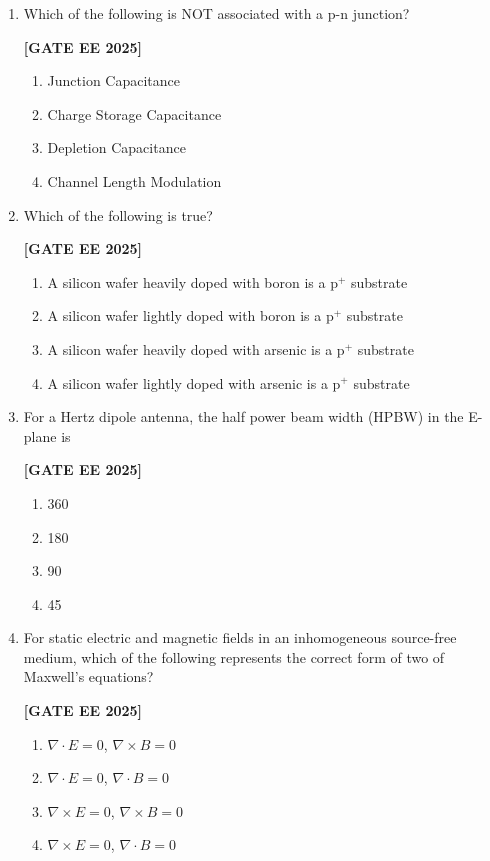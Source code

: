 \documentclass[12pt]{article}
\begin{document}
\begin{enumerate}[leftmargin=2.5em, label=\textbf{Q.\arabic*}., itemsep=2em]
\item
Which of the following is NOT associated with a p-n junction?
 
\noindent \textbf{[GATE EE 2025]}
\begin{enumerate}
  \item Junction Capacitance
  \item Charge Storage Capacitance
  \item Depletion Capacitance
  \item Channel Length Modulation
\end{enumerate}

\item
Which of the following is true?
 
\noindent \textbf{[GATE EE 2025]}
\begin{enumerate}
  \item A silicon wafer heavily doped with boron is a p$^+$ substrate
  \item A silicon wafer lightly doped with boron is a p$^+$ substrate
  \item A silicon wafer heavily doped with arsenic is a p$^+$ substrate
  \item A silicon wafer lightly doped with arsenic is a p$^+$ substrate
\end{enumerate}

\item
For a Hertz dipole antenna, the half power beam width (HPBW) in the E-plane is
 
\noindent \textbf{[GATE EE 2025]}
\begin{enumerate}
  \item 360\degree
  \item 180\degree
  \item 90\degree
  \item 45\degree
\end{enumerate}

\item
For static electric and magnetic fields in an inhomogeneous source-free medium, which of the following represents the correct form of two of Maxwell's equations?
 
\noindent \textbf{[GATE EE 2025]}
\begin{enumerate}
  \item $\nabla \cdot E = 0$, \quad $\nabla \times B = 0$
  \item $\nabla \cdot E = 0$, \quad $\nabla \cdot B = 0$
  \item $\nabla \times E = 0$, \quad $\nabla \times B = 0$
  \item $\nabla \times E = 0$, \quad $\nabla \cdot B = 0$
\end{enumerate}



\end{enumerate}
\end{document}
